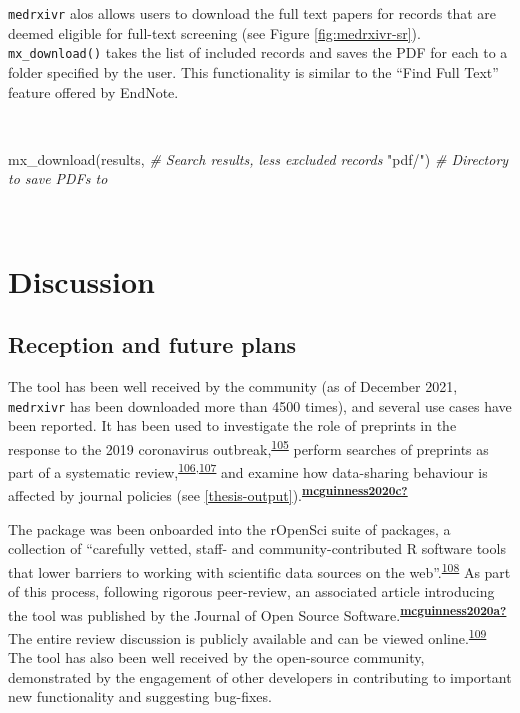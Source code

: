 \documentclass[a4paper, twoside]{templates/ociamthesis}
\newenvironment{Shaded}{\begin{snugshade}}{\end{snugshade}}
\newcommand{\CommentTok}[1]{\textcolor[rgb]{0.56,0.35,0.01}{\textit{#1}}}
\newcommand{\FunctionTok}[1]{\textcolor[rgb]{0.00,0.00,0.00}{#1}}
\newcommand{\NormalTok}[1]{#1}
\newcommand{\StringTok}[1]{\textcolor[rgb]{0.31,0.60,0.02}{#1}}
\renewenvironment{Shaded}
{
  \vspace{4pt}%
  \begin{snugshade}%
}{%
  \end{snugshade}%
  \vspace{4pt}%
}
\begin{document}
\texttt{medrxivr} alos allows users to download the full text papers for records that are deemed eligible for full-text screening (see Figure \ref{fig:medrxivr-sr}). \texttt{mx\_download()} takes the list of included records and saves the PDF for each to a folder specified by the user. This functionality is similar to the ``Find Full Text'' feature offered by EndNote.

~

\begin{Shaded}
\begin{Highlighting}[]
\FunctionTok{mx\_download}\NormalTok{(results,  }\CommentTok{\# Search results, less excluded records}
            \StringTok{"pdf/"}\NormalTok{)   }\CommentTok{\# Directory to save PDFs to }
\end{Highlighting}
\end{Shaded}

~

\hypertarget{discussion}{%
\section{Discussion}\label{discussion}}

\hypertarget{reception-and-future-plans}{%
\subsection{Reception and future plans}\label{reception-and-future-plans}}

The tool has been well received by the community (as of December 2021, \texttt{medrxivr} has been downloaded more than 4500 times), and several use cases have been reported. It has been used to investigate the role of preprints in the response to the 2019 coronavirus outbreak,\textsuperscript{\protect\hyperlink{ref-kodvanj2020}{105}} perform searches of preprints as part of a systematic review,\textsuperscript{\protect\hyperlink{ref-noone2020}{106},\protect\hyperlink{ref-grassly2020}{107}} and examine how data-sharing behaviour is affected by journal policies (see \ref{thesis-output}).\textsuperscript{\protect\hyperlink{ref-mcguinness2020c}{\textbf{mcguinness2020c?}}}

The package was been onboarded into the rOpenSci suite of packages, a collection of ``carefully vetted, staff- and community-contributed R software tools that lower barriers to working with scientific data sources on the web''.\textsuperscript{\protect\hyperlink{ref-boettiger2015}{108}} As part of this process, following rigorous peer-review, an associated article introducing the tool was published by the Journal of Open Source Software.\textsuperscript{\protect\hyperlink{ref-mcguinness2020a}{\textbf{mcguinness2020a?}}} The entire review discussion is publicly available and can be viewed online.\textsuperscript{\protect\hyperlink{ref-zotero-15016}{109}} The tool has also been well received by the open-source community, demonstrated by the engagement of other developers in contributing to important new functionality and suggesting bug-fixes.
\end{document}
